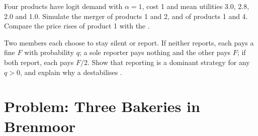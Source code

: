 \begin{exercise}[$\star\star\star$]\label{exo:b3:oligopoly-and-collusion:11}
Four products have logit demand with $\alpha = 1$, cost 1 and mean utilities 3.0, 2.8, 2.0 and 1.0. Simulate
the merger of products 1 and 2, and of products 1 and 4. Compare the price rises of product
1 with the .
\end{exercise}

\begin{exercise}[$\star\star\star$]\label{exo:b3:oligopoly-and-collusion:12}
Two  members each choose to stay silent or report. If neither reports, each
pays a fine $F$ with probability $q$; a sole reporter pays nothing and the other pays $F$; if both report,
each pays $F/2$. Show that reporting is a dominant strategy for any $q > 0$, and explain why a
 destabilises .
\end{exercise}

\section{Problem: Three Bakeries in Brenmoor}\label{sec:b3:oligopoly-and-collusion:problem}

